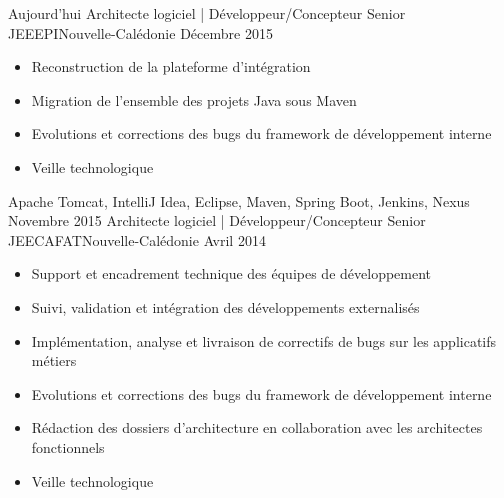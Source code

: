 %
%
%

\begin{experiences}
  \experience
    {Aujourd'hui}   {Architecte logiciel | Développeur/Concepteur Senior JEE}{EPI}{Nouvelle-Calédonie}
    {Décembre 2015} {
                      \begin{itemize}
                        \item Reconstruction de la plateforme d'intégration                        
                        \item Migration de l'ensemble des projets Java sous Maven                    
                        \item Evolutions et corrections des bugs du framework de développement interne                
                        \item Veille technologique                                                                    
                      \end{itemize}
                    }
                    {Apache Tomcat, IntelliJ Idea, Eclipse, Maven, Spring Boot, Jenkins, Nexus}
  \emptySeparator
  \experience
    {Novembre 2015} {Architecte logiciel | Développeur/Concepteur Senior JEE}{CAFAT}{Nouvelle-Calédonie}
    {Avril 2014}    {
                      \begin{itemize}
                        \item Support et encadrement technique des équipes de développement                           
                        \item Suivi, validation et intégration des développements externalisés                        
                        \item Implémentation, analyse et livraison de correctifs de bugs sur les applicatifs métiers  
                        \item Evolutions et corrections des bugs du framework de développement interne                
                        \item Rédaction des dossiers d'architecture en collaboration avec les architectes fonctionnels
                        \item Veille technologique                                                                    

\end{itemize}}
\end{experiences}
